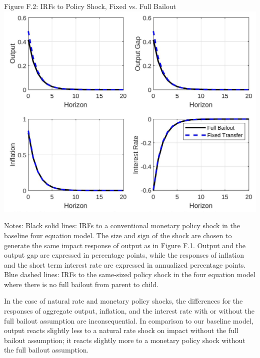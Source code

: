 \documentclass[10pt]{article}
\begin{document}
Figure F.2: IRFs to Policy Shock, Fixed vs. Full Bailout\\
\includegraphics[max width=\textwidth, center]{2024_12_20_23d1456f4ac472ebd83dg-12}

Notes: Black solid lines: IRFs to a conventional monetary policy shock in the baseline four equation model. The size and sign of the shock are chosen to generate the same impact response of output as in Figure F.1. Output and the output gap are expressed in percentage points, while the responses of inflation and the short term interest rate are expressed in annualized percentage points. Blue dashed lines: IRFs to the same-sized policy shock in the four equation model where there is no full bailout from parent to child.

In the case of natural rate and monetary policy shocks, the differences for the responses of aggregate output, inflation, and the interest rate with or without the full bailout assumption are inconsequential. In comparison to our baseline model, output reacts slightly less to a natural rate shock on impact without the full bailout assumption; it reacts slightly more to a monetary policy shock without the full bailout assumption.
\end{document}
